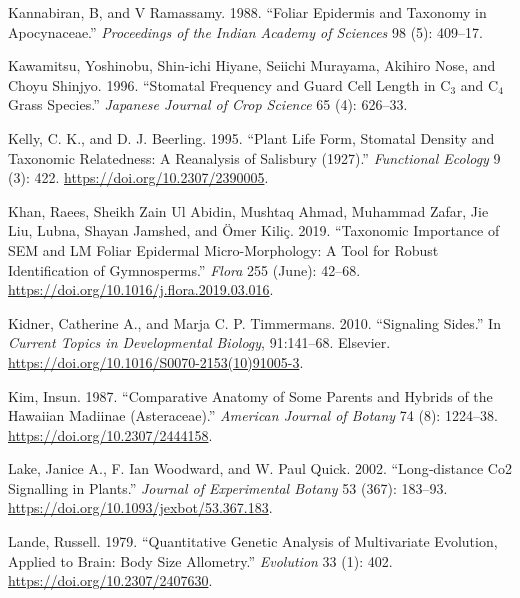 \documentclass[
  12pt,
]{article}
\newlength{\cslhangindent}
\newlength{\cslentryspacingunit} %
\newenvironment{CSLReferences}[2] %
 {%
  \setlength{\parindent}{0pt}
  \ifodd #1
  \let\oldpar\par
  \def\par{\hangindent=\cslhangindent\oldpar}
  \fi
  \setlength{\parskip}{#2\cslentryspacingunit}
 }%
 {}
\begin{document}
\begin{CSLReferences}{1}{0}
\leavevmode{}%
Kannabiran, B, and V Ramassamy. 1988. {``Foliar Epidermis and Taxonomy in {Apocynaceae}.''} \emph{Proceedings of the Indian Academy of Sciences} 98 (5): 409--17.

\leavevmode{}%
Kawamitsu, Yoshinobu, Shin-ichi Hiyane, Seiichi Murayama, Akihiro Nose, and Choyu Shinjyo. 1996. {``Stomatal Frequency and Guard Cell Length in {C}\(_{\textrm{3}}\) and {C}\(_{\textrm{4}}\) Grass Species.''} \emph{Japanese Journal of Crop Science} 65 (4): 626--33.

\leavevmode{}%
Kelly, C. K., and D. J. Beerling. 1995. {``Plant {Life} {Form}, {Stomatal} {Density} and {Taxonomic} {Relatedness}: {A} {Reanalysis} of {Salisbury} (1927).''} \emph{Functional Ecology} 9 (3): 422. \url{https://doi.org/10.2307/2390005}.

\leavevmode{}%
Khan, Raees, Sheikh Zain Ul Abidin, Mushtaq Ahmad, Muhammad Zafar, Jie Liu, Lubna, Shayan Jamshed, and Ömer Kiliç. 2019. {``Taxonomic Importance of {SEM} and {LM} Foliar Epidermal Micro-Morphology: {A} Tool for Robust Identification of Gymnosperms.''} \emph{Flora} 255 (June): 42--68. \url{https://doi.org/10.1016/j.flora.2019.03.016}.

\leavevmode{}%
Kidner, Catherine A., and Marja C. P. Timmermans. 2010. {``Signaling {Sides}.''} In \emph{Current {Topics} in {Developmental} {Biology}}, 91:141--68. Elsevier. \url{https://doi.org/10.1016/S0070-2153(10)91005-3}.

\leavevmode{}%
Kim, Insun. 1987. {``Comparative {Anatomy} of {Some} {Parents} and {Hybrids} of the {Hawaiian} {Madiinae} ({Asteraceae}).''} \emph{American Journal of Botany} 74 (8): 1224--38. \url{https://doi.org/10.2307/2444158}.

\leavevmode{}%
Lake, Janice A., F. Ian Woodward, and W. Paul Quick. 2002. {``Long‐distance {Co2} Signalling in Plants.''} \emph{Journal of Experimental Botany} 53 (367): 183--93. \url{https://doi.org/10.1093/jexbot/53.367.183}.

\leavevmode{}%
Lande, Russell. 1979. {``Quantitative {Genetic} {Analysis} of {Multivariate} {Evolution}, {Applied} to {Brain}: {Body} {Size} {Allometry}.''} \emph{Evolution} 33 (1): 402. \url{https://doi.org/10.2307/2407630}.


\end{CSLReferences}
\end{document}
